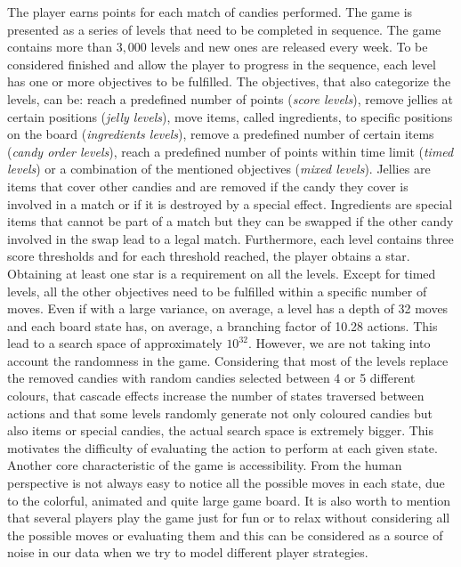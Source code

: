 The player earns points for each match of candies performed. The game is presented as a series of levels that need to be completed in sequence. The game contains more than $3,000$ levels and new ones are released every week. To be considered finished and allow the player to progress in the sequence, each level has one or more objectives to be fulfilled. The objectives, that also categorize the levels, can be: reach a predefined number of points (\textit{score levels}), remove jellies at certain positions (\textit{jelly levels}), move items, called ingredients, to specific positions on the board (\textit{ingredients levels}), remove a predefined number of certain items (\textit{candy order levels}), reach a predefined number of points within time limit (\textit{timed levels}) or a combination of the mentioned objectives (\textit{mixed levels}). Jellies are items that cover other candies and are removed if the candy they cover is involved in a match or if it is destroyed by a special effect. Ingredients are special items that cannot be part of a match but they can be swapped if the other candy involved in the swap lead to a legal match. Furthermore, each level contains three score thresholds and for each threshold reached, the player obtains a star. Obtaining at least one star is a requirement on all the levels. Except for timed levels, all the other objectives need to be fulfilled within a specific number of moves. Even if with a large variance, on average, a level has a depth of 32 moves and each board state has, on average, a branching factor of 10.28 actions. This lead to a search space of approximately $10^{32}$. However, we are not taking into account the randomness in the game. Considering that most of the levels replace the removed candies with random candies selected between 4 or 5 different colours, that cascade effects increase the number of states traversed between actions and that some levels randomly generate not only coloured candies but also items or special candies, the actual search space is extremely bigger.
This motivates the difficulty of evaluating the action to perform at each given state.
Another core characteristic of the game is accessibility. From the human perspective is not always easy to notice all the possible moves in each state, due to the colorful, animated and quite large game board. It is also worth to mention that several players play the game just for fun or to relax without considering all the possible moves or evaluating them and this can be considered as a source of noise in our data when we try to model different player strategies.

